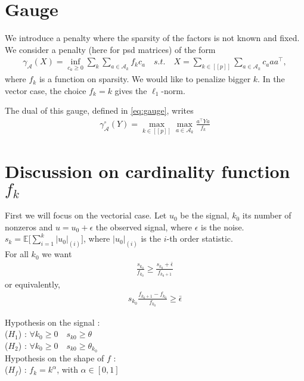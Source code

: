 \documentclass{article}
\def\A{\mathcal{A}}
\def\ga{\gamma_\mathcal{A}}
\def\goa{\gamma^{\circ}_{\A}}
\newcommand\itgset[1]{[\!\![#1]\!\!]}
\def\EE{\mathbb{E}}
\begin{document}
\section{Gauge}
We introduce a penalty where the sparsity of the factors is not known and fixed. We consider a penalty (here for psd matrices) of the form
\begin{align}
\label{eq:gauge}
\ga(X)=\inf_{c_a\geq 0} \sum_{k}\sum_{a\in\A_{k}}f_k c_a \quad s.t.\quad X=\sum_{k\in\itgset{p}}\sum_{a\in\A_{k}}c_a aa^{\top},
\end{align}
where $f_k$ is a function on sparsity. We would like to penalize bigger $k$. In the vector case, the choice $f_k=k$ gives the $\ell_1$-norm.

The dual of this gauge, defined in \ref{eq:gauge}, writes
\begin{align}
\label{eq:dualgauge}
\goa(Y)=\max_{k\in\itgset{p}}\max_{a\in\A_{k}} \frac{a^{\top}Ya}{f_k}
\end{align}

\section{Discussion on cardinality function $f_k$}
First we will focus on the vectorial case. Let $u_0$ be the signal, $k_0$ its number of nonzeros and $u=u_0+\epsilon$ the observed signal, where $\epsilon$ is the noise. $s_k=\EE\big[\sum_{i=1}^{k}|u_0|_{(i)}\big]$, where $|u_0|_{(i)}$ is the $i$-th order statistic.\\

For all $k_0$ we want 
\begin{align}
\label{eq:cond1}
\frac{s_{k_0}}{f_{k_0}}\geq \frac{s_{k_0} + \bar{\epsilon}}{f_{k_0+1}}
\end{align}
or equivalently,
\begin{align}
\label{eq:cond1bis}
s_{k_0}\frac{f_{k_0+1}-f_{k_0}}{f_{k_0}}\geq  \bar{\epsilon}
\end{align}

Hypothesis on the signal :\\
($H_1$) : $\forall k_0\geq 0 \quad s_{k0}\geq \theta$\\
($H_2$) : $\forall k_0\geq 0 \quad s_{k0}\geq \theta_{k_0}$\\

Hypothesis on the shape of $f$ :\\
($H_f$) : $f_k=k^{\alpha}$, with $\alpha\in [0,1]$\\
\end{document}

